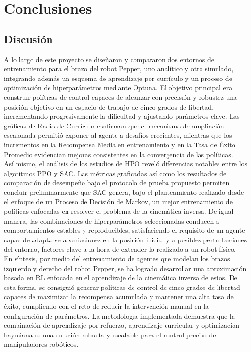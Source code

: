 \section{Conclusiones}

\subsection{Discusión}

A lo largo de este proyecto se diseñaron y compararon dos entornos de entrenamiento para el brazo del robot Pepper, uno analítico y otro simulado, integrando además un esquema de aprendizaje por currículo y un proceso de optimización de hiperparámetros mediante Optuna. El objetivo principal era construir políticas de control capaces de alcanzar con precisión y robustez una posición objetivo en un espacio de trabajo de cinco grados de libertad, incrementando progresivamente la dificultad y ajustando parámetros clave. Las gráficas de Radio de Currículo confirman que el mecanismo de ampliación escalonada permitió exponer al agente a desafíos crecientes, mientras que los incrementos en la Recompensa Media en entrenamiento y en la Tasa de Éxito Promedio evidencian mejoras consistentes en la convergencia de las políticas.\\

Así mismo, el análisis de los estudios de HPO reveló diferencias notables entre los algoritmos PPO y SAC. Las métricas graficadas así como los resultados de comparación de desempeño bajo el protocolo de prueba propuesto permiten concluir preliminarmente que SAC genera, bajo el planteamiento realizado desde el enfoque de un Proceso de Decisión de Markov, un mejor entrenamiento de políticas enfocadas en resolver el problema de la cinemática inversa. De igual manera, las combinaciones de hiperparámetros seleccionadas conducen a comportamientos estables y reproducibles, satisfaciendo el requisito de un agente capaz de adaptarse a variaciones en la posición inicial y a posibles perturbaciones del entorno, factores clave a la hora de extender lo realizado a un robot físico.\\

En síntesis, por medio del entrenamiento de agentes que modelan los brazos izquierdo y derecho del robot Pepper, se ha logrado desarrollar una aproximación basada en RL enfocada en el aprendizaje de la cinemática inversa de estos. De esta forma, se consiguió generar políticas de control de cinco grados de libertad capaces de maximizar la recompensa acumulada y mantener una alta tasa de éxito, cumpliendo con el reto de reducir la intervención manual en la configuración de parámetros. La metodología implementada demuestra que la combinación de aprendizaje por refuerzo, aprendizaje curricular y optimización bayesiana es una solución robusta y escalable para el control preciso de manipuladores robóticos.


